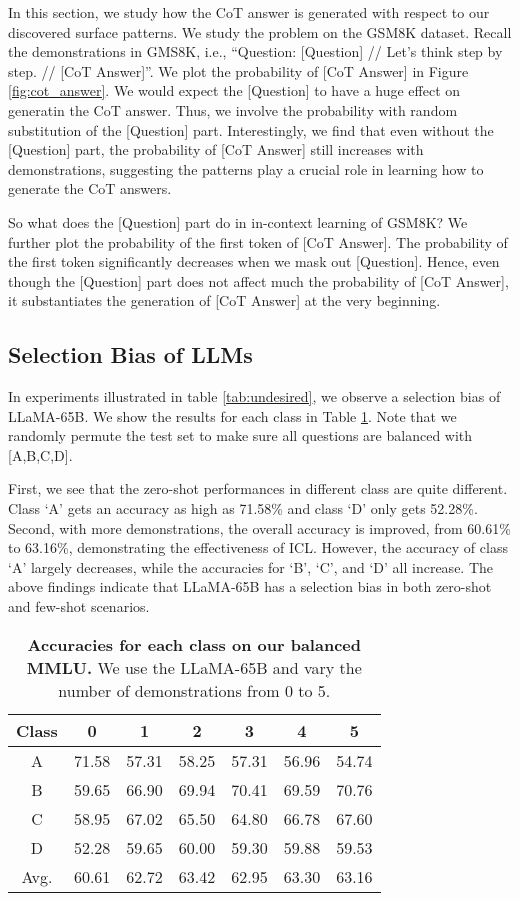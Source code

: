 In this section, we study how the CoT answer is generated with respect to our discovered surface patterns. We study the problem on the GSM8K dataset. 
Recall the demonstrations in GMS8K, i.e., ``Question: [Question] // Let's think step by step. // [CoT Answer]''. 
We plot the probability of [CoT Answer] in Figure \ref{fig:cot_answer}. 
We would expect the [Question] to have a huge effect on generatin the CoT answer. 
Thus, we involve the probability with random substitution of the [Question] part. 
Interestingly, we find that even without the [Question] part, the probability of [CoT Answer] still increases with demonstrations, suggesting the patterns play a crucial role in learning how to generate the CoT answers. 

So what does the [Question] part do in in-context learning of GSM8K? 
We further plot the probability of the first token of [CoT Answer]. 
The probability of the first token significantly decreases when we mask out [Question]. 
Hence, even though the [Question] part does not affect much the probability of [CoT Answer], it substantiates the generation of [CoT Answer] at the very beginning.



\subsection{Selection Bias of LLMs}
In experiments illustrated in table \ref{tab:undesired}, we observe a selection bias of LLaMA-65B. 
We show the results for each class in Table \ref{tab:selection_bias}.
Note that we randomly permute the test set to make sure all questions are balanced with [A,B,C,D]. 

First, we see that the zero-shot performances in different class are quite different. Class `A' gets an accuracy as high as 71.58\% and class `D' only gets 52.28\%. Second, with more demonstrations, the overall accuracy is improved, from 60.61\% to 63.16\%, demonstrating the effectiveness of ICL. However, the accuracy of class `A' largely decreases, while the accuracies for `B', `C', and `D' all increase. 
The above findings indicate that LLaMA-65B has a selection bias in both zero-shot and few-shot scenarios. 

\begin{table}[htbp]
    \centering
    \caption{\textbf{Accuracies for each class on our balanced MMLU.} We use the LLaMA-65B and vary the number of demonstrations from 0 to 5.}
    \label{tab:selection_bias}
    \begin{tabular}{c|cccccc}
        Class & 0 & 1 & 2 & 3 & 4 & 5 \\
        \midrule
        A & 71.58 & 57.31 & 58.25 & 57.31 & 56.96 & 54.74 \\
        B & 59.65 & 66.90 & 69.94 & 70.41 & 69.59 & 70.76 \\
        C & 58.95 & 67.02 & 65.50 & 64.80 & 66.78 & 67.60 \\
        D & 52.28 & 59.65 & 60.00 & 59.30 & 59.88 & 59.53 \\
        \hline
        Avg. & 60.61 & 62.72 & 63.42 & 62.95 & 63.30 & 63.16 \\
\end{tabular}
\end{table}